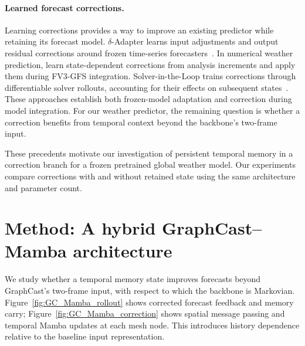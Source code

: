 \documentclass{article}
\newcommand{\vfourchange}[1]{{\color{blue}#1}}
\newcommand{\vfourred}[1]{{\color{red}#1}}
\newif\ifvfivechanges
\newcommand{\vfiveidentity}[1]{#1}
\DeclareRobustCommand{\vfiveadded}[1]{\ifvfivechanges{\color{vfiveAdded}%
  \let\vfourchange\vfiveidentity\let\vfourred\vfiveidentity#1}\else{\color{blue}%
  \let\vfourchange\vfiveidentity\let\vfourred\vfiveidentity#1}\fi}
\begin{document}
\paragraph{Learned forecast corrections.}
Learning corrections provides a way to improve an existing predictor while retaining its forecast model. $\delta$-Adapter learns input adjustments and output residual corrections around frozen time-series forecasters~\citep{liang2026forecast}. In numerical weather prediction, \citet{chen2022correcting} learn state-dependent corrections from analysis increments and apply them during FV3-GFS integration. Solver-in-the-Loop trains corrections through differentiable solver rollouts, accounting for their effects on subsequent states~\citep{um2020solver}. These approaches establish both frozen-model adaptation and correction during model integration. For our weather predictor, the remaining question is whether a correction benefits from temporal context beyond the backbone's two-frame input.

These precedents motivate our investigation of persistent temporal memory in a correction branch for a frozen pretrained global weather model. Our experiments compare corrections with and without retained state using the same architecture and parameter count.
\par
\endgroup


\section{Method: A hybrid GraphCast--Mamba architecture}


\ifvfivechanges
\par\begingroup\color{vfiveDeleted}\noindent
\sout{We study whether a temporal memory state improves forecasts beyond the finite input history supplied to the frozen GraphCast backbone. GraphCast uses two successive atmospheric states as input; its forecast is Markovian with respect to this augmented state. Figure~\mbox{\ref{fig:GC_Mamba_rollout}} shows how the Mamba correction branch corrects each GraphCast backbone forecast and carries its temporal memory state across successive six-hour steps. The GraphCast--Mamba forecast advances the meteorological input window, while the temporal memory state retains information from the preceding trajectory. Figure~\mbox{\ref{fig:GC_Mamba_correction}} details how graph message passing mixes information across mesh nodes and Mamba updates memory independently at each node. This introduces history dependence relative to the baseline input representation.}
\par\endgroup
\fi
\vfiveadded{We study whether a temporal memory state improves forecasts beyond GraphCast's two-frame input, with respect to which the backbone is Markovian. Figure~\ref{fig:GC_Mamba_rollout} shows corrected forecast feedback and memory carry; Figure~\ref{fig:GC_Mamba_correction} shows spatial message passing and temporal Mamba updates at each mesh node. This introduces history dependence relative to the baseline input representation.}
\end{document}
